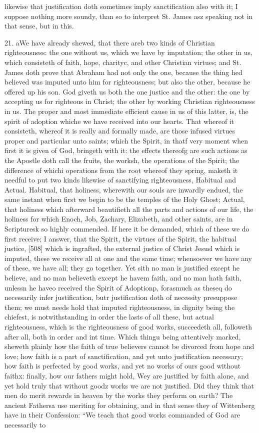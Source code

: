 likewise that justification doth sometimes imply sanctification also with it; I suppose nothing more soundy, than so to interpret St. James asz speaking not in that sense, but in this.

21. aWe have already shewed, that there areb two kinds of Christian righteousness: the one without us, which we have by imputation; the other in us, which consisteth of faith, hope, charityc, and other Christian virtues; and St. James doth prove that Abraham had not only the one, because the thing hed believed was imputed unto him for righteousness; but also the other, because he offered up his son. God giveth us both the one justice and the other: the one by accepting us for righteous in Christ; the other by working Christian righteousness in us. The proper and most immediate efficient cause in us of this latter, is, the spirit of adoption whiche we have received into our hearts. That whereof it consisteth, whereof it is really and formally made, are those infused virtues proper and particular unto saints; which the Spirit, in thatf very moment when first it is given of God, bringeth with it: the effects thereofg are such actions as the Apostle doth call the fruits, the worksh, the operations of the Spirit; the difference of whichi operations from the root whereof they spring, maketh it needful to put two kinds likewise of sanctifying righteousness, Habitual and Actual. Habitual, that holiness, wherewith our souls are inwardly endued, the same instant when first we begin to be the temples of the Holy Ghost; Actual, that holiness which afterward beautifieth all the parts and actions of our life, the holiness for which Enoch, Job, Zachary, Elizabeth, and other saints, are in Scripturesk so highly commended. If here it be demanded, which of these we do first receive; I answer, that the Spirit, the virtues of the Spirit, the habitual justice, [508] which is ingrafted, the external justice of Christ Jesusl which is imputed, these we receive all at one and the same time; whensoever we have any of these, we have all; they go together. Yet sith no man is justified except he believe, and no man believeth except he havem faith, and no man hath faith, unlessn he haveo received the Spirit of Adoptionp, forasmuch as theseq do necessarily infer justification, butr justification doth of necessity presuppose them; we must needs hold that imputed righteousness, in dignity being the chiefest, is notwithstanding in order the lasts of all these, but actual righteousness, which is the righteousness of good works, succeedeth all, followeth after all, both in order and int time. Which thingu being attentively marked, sheweth plainly how the faith of true believers cannot be divorced from hope and love; how faith is a part of sanctification, and yet unto justification necessary; how faith is perfected by good works, and yet no works of ours good without faithx: finally, how our fathers might hold, Wey are justified by faith alone, and yet hold truly that without goodz works we are not justified. Did they think that men do merit rewards in heaven by the works they perform on earth? The ancient Fathersa use meriting for obtaining, and in that sense they of Wittenberg have in their Confession: “We teach that good works commanded of God are necessarily to 